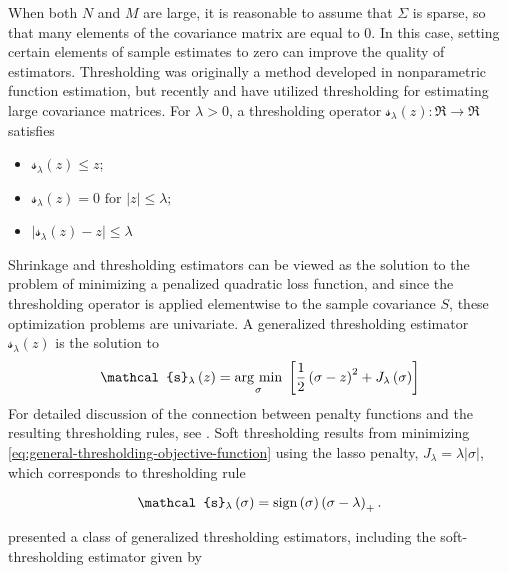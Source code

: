 When both $N$ and $M$ are large, it is reasonable to assume that $\Sigma$ is sparse, so that many elements of the covariance matrix are equal to 0. In this case, setting certain elements of sample estimates to zero can improve the quality of estimators. Thresholding was originally a method developed in nonparametric function estimation, but recently \cite{bickel2008covariance} and \cite{rothman2009generalized} have utilized thresholding for estimating large covariance matrices.  For $\lambda > 0$, a thresholding operator $\mathcal{s}_\lambda\left( z \right): \Re \rightarrow \Re$ satisfies 
\begin{itemize}
\item $\mathcal{s}_\lambda\left( z \right) \le z$;
\item $\mathcal{s}_\lambda\left( z \right) = 0 \mbox{ for } \vert z\vert \le \lambda$;
\item $\vert \mathcal{s}_\lambda\left( z \right) - z \vert \le \lambda$
\end{itemize}

Shrinkage and thresholding estimators can be viewed as the solution to the problem of minimizing a penalized quadratic loss function, and since the thresholding operator is applied elementwise to the sample covariance $S$,  these optimization problems are univariate. A generalized thresholding estimator $\mathcal{s}_\lambda\left( z \right)$ is the solution to
\begin{equation} \label{eq:general-thresholding-objective-function}
\mathcal{s}_\lambda\left( z \right)  = \argmin{\sigma} \left[ \frac{1}{2} \left(\sigma - z\right)^2 + J_\lambda\left(\sigma \right)\right]
\end{equation}
\noindent
For detailed discussion of the connection between penalty functions and the resulting thresholding rules, see \cite{antoniadis2001regularization}. Soft thresholding results from minimizing \ref{eq:general-thresholding-objective-function} using the lasso penalty, $J_\lambda = \lambda \vert \sigma \vert$, which corresponds to thresholding rule

\begin{equation} 
\mathcal{s}_\lambda\left( \sigma \right) = \textup{sign}\left(\sigma\right) \left(\sigma  - \lambda\right)_+.
\end{equation}

\cite{rothman2009generalized} presented a class of generalized thresholding estimators, including the soft-thresholding estimator given by

